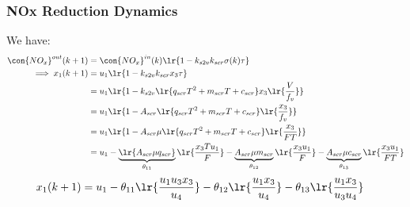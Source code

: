 \subsubsection{NOx Reduction Dynamics}
We have:
\begin{align*}
    \con{NO_x}^{out} (k + 1) &= \con{NO_x}^{in} (k) \lr{1 - k_{s2v} k_{scr} \sigma(k) \tau}\\
    \implies x_1 (k+1) &= u_1 \lr{1 - k_{s2v} k_{scr} x_3 \tau}\\
                    &= u_1 \lr{1 - k_{s2v}\lr{q_{scr} T^2 + m_{scr}T + c_{scr}} x_3 \lr{\frac{V}{f_v}}}\\
                    &= u_1 \lr{1 - A_{scr}\lr{ q_{scr} T^2 + m_{scr}T + c_{scr}} \lr{\frac{x_3}{f_v}}}\\
                    &= u_1 \lr{1 - A_{scr}\mu \lr{ q_{scr} T^2 + m_{scr}T + c_{scr}} \lr{\frac{x_3}{F T}}}\\
                    &= u_1 - \underbrace{\lr{A_{scr} \mu q_{scr}}}_{\theta_{11}} \lr{ \frac{x_3 T u_1}{F}}
                                 - \underbrace{A_{scr} \mu m_{scr}}_{\theta_{12}} \lr{ \frac{x_3 u_1}{F}}
                                 - \underbrace{A_{scr} \mu c_{scr}}_{\theta_{13}} \lr{ \frac{x_3 u_1}{FT}}
\end{align*}
\begin{align}
    x_1(k+1)  &= u_1 - \theta_{11} \lr{\frac{u_1 u_3 x_3}{u_4}}
                                     - \theta_{12} \lr{\frac{u_1 x_3}{u_4}}
                                     - \theta_{13} \lr{\frac{u_1 x_3}{u_3 u_4}}
\end{align}
